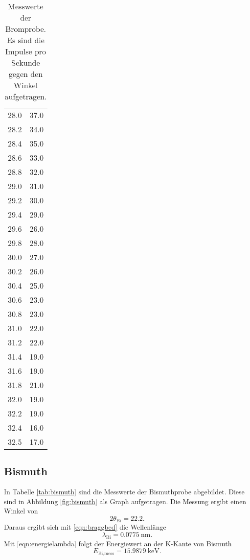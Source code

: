 \begin{table}[h]
\begin{tabular}{S S}
    28.0 & 37.0 \\
    28.2 & 34.0 \\
    28.4 & 35.0 \\
    28.6 & 33.0 \\
    28.8 & 32.0 \\
    29.0 & 31.0 \\
    29.2 & 30.0 \\
    29.4 & 29.0 \\
    29.6 & 26.0 \\
    29.8 & 28.0 \\
    30.0 & 27.0 \\
    30.2 & 26.0 \\
    30.4 & 25.0 \\
    30.6 & 23.0 \\
    30.8 & 23.0 \\
    31.0 & 22.0 \\
    31.2 & 22.0 \\
    31.4 & 19.0 \\
    31.6 & 19.0 \\
    31.8 & 21.0 \\
    32.0 & 19.0 \\
    32.2 & 19.0 \\
    32.4 & 16.0 \\
    32.5 & 17.0 \\
    \bottomrule
  \end{tabular}
  \caption{Messwerte der Bromprobe. Es sind die
  Impulse pro Sekunde gegen den Winkel aufgetragen.}
  \label{tab:brom}
\end{table}

\subsection{Bismuth}

In Tabelle \ref{tab:bismuth} sind die Messwerte der Bismuthprobe abgebildet.
Diese sind in Abbildung \ref{fig:bismuth} als Graph aufgetragen.
Die Messung ergibt einen Winkel von
\begin{equation}
  2\theta_\text{Bi} = 22.2 .
\end{equation}
Daraus ergibt sich mit \eqref{eqn:braggbed} die Wellenlänge
\begin{equation}
  \lambda_\text{Bi} = \SI{0.0775}{\nano\meter}.
\end{equation}
Mit \eqref{eqn:energielambda} folgt der Energiewert an der K-Kante von Bismuth
\begin{equation}
  E_\text{Bi,mess} = \SI{15.9879}{\kilo\electronvolt}.
\end{equation}

